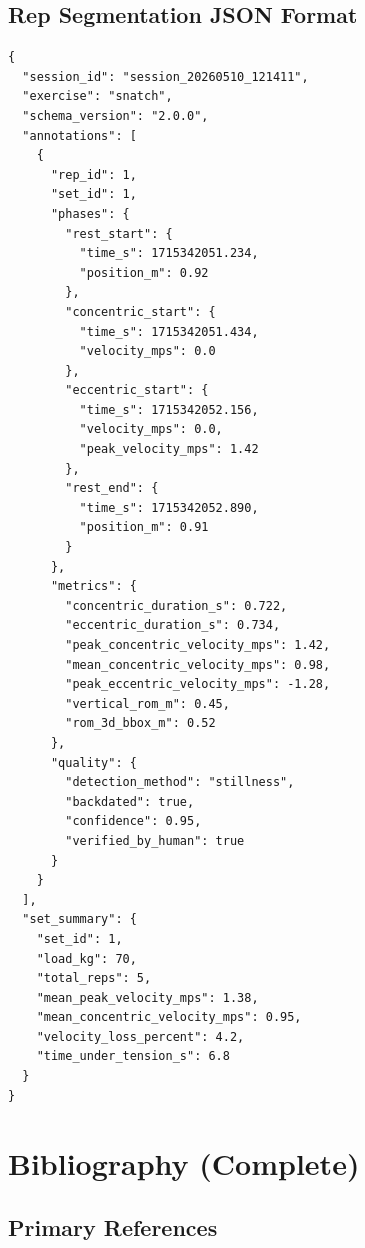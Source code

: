 \section{Rep Segmentation JSON Format}

\begin{lstlisting}[caption={Rep Segmentation JSON Format}]
{
  "session_id": "session_20260510_121411",
  "exercise": "snatch",
  "schema_version": "2.0.0",
  "annotations": [
    {
      "rep_id": 1,
      "set_id": 1,
      "phases": {
        "rest_start": {
          "time_s": 1715342051.234,
          "position_m": 0.92
        },
        "concentric_start": {
          "time_s": 1715342051.434,
          "velocity_mps": 0.0
        },
        "eccentric_start": {
          "time_s": 1715342052.156,
          "velocity_mps": 0.0,
          "peak_velocity_mps": 1.42
        },
        "rest_end": {
          "time_s": 1715342052.890,
          "position_m": 0.91
        }
      },
      "metrics": {
        "concentric_duration_s": 0.722,
        "eccentric_duration_s": 0.734,
        "peak_concentric_velocity_mps": 1.42,
        "mean_concentric_velocity_mps": 0.98,
        "peak_eccentric_velocity_mps": -1.28,
        "vertical_rom_m": 0.45,
        "rom_3d_bbox_m": 0.52
      },
      "quality": {
        "detection_method": "stillness",
        "backdated": true,
        "confidence": 0.95,
        "verified_by_human": true
      }
    }
  ],
  "set_summary": {
    "set_id": 1,
    "load_kg": 70,
    "total_reps": 5,
    "mean_peak_velocity_mps": 1.38,
    "mean_concentric_velocity_mps": 0.95,
    "velocity_loss_percent": 4.2,
    "time_under_tension_s": 6.8
  }
}
\end{lstlisting}

\chapter{Bibliography (Complete)}

\section{Primary References}

